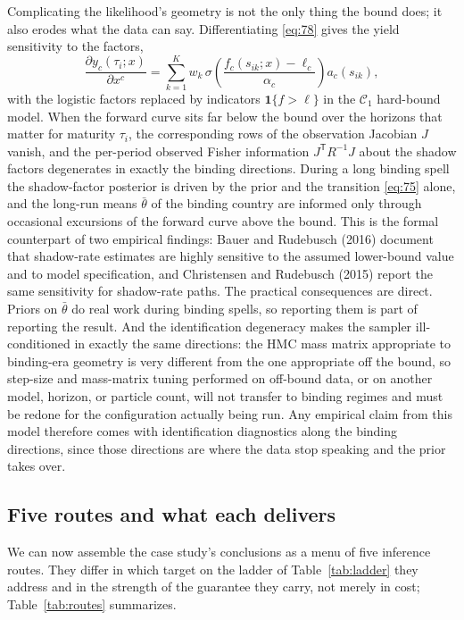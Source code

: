 \documentclass[11pt]{article}
\begin{document}
Complicating the likelihood's geometry is not the only thing the bound
does; it also erodes what the data can say. Differentiating \eqref{eq:78} gives the
yield sensitivity to the factors,
\begin{equation}\label{eq:92}
 \frac{\partial y_c(\tau_i;x)}{\partial x^c}
 =\sum_{k=1}^{K}w_k\,
 \sigma\!\left(\frac{f_c(s_{ik};x)-\ell_c}{\alpha_c}\right)
 a_c(s_{ik}),
\end{equation}
with the logistic factors replaced by indicators
\(\mathbf 1\{f>\ell\}\) in the \(\mathcal C_1\) hard-bound model. When
the forward curve sits far below the bound over the horizons that
matter for maturity \(\tau_i\), the corresponding rows of the
observation Jacobian \(J\) vanish, and the per-period observed Fisher
information \(J^{\mathsf T}R^{-1}J\) about the shadow factors
degenerates in exactly the binding directions. During a long binding
spell the shadow-factor posterior is driven by the prior and the
transition \eqref{eq:75} alone, and the long-run means \(\bar\theta\)
of the binding country are informed only through occasional excursions
of the forward curve above the bound. This is the formal counterpart of
two empirical findings: Bauer and Rudebusch (2016) document that
shadow-rate estimates are highly sensitive to the assumed lower-bound
value and to model specification, and Christensen and Rudebusch (2015)
report the same sensitivity for shadow-rate paths. The practical
consequences are direct. Priors on \(\bar\theta\) do real work during
binding spells, so reporting them is part of reporting the result. And the
identification degeneracy makes the sampler ill-conditioned in exactly the same
directions: the HMC mass matrix appropriate to binding-era geometry is
very different from the one appropriate off the bound, so step-size and
mass-matrix tuning performed on off-bound data, or on another
model, horizon, or particle count, will not transfer to binding
regimes and must be redone for the configuration actually being run.
Any empirical claim from this model therefore comes with identification
diagnostics along the binding directions, since those directions are where
the data stop speaking and the prior takes over.

\subsection{Five routes and what each delivers}
\label{sec:shadow-routes}

We can now assemble the case study's conclusions as a menu of five
inference routes. They differ in which target on the ladder of
Table~\ref{tab:ladder} they address and in the strength of the
guarantee they carry, not merely in cost; Table~\ref{tab:routes}
summarizes.
\end{document}
